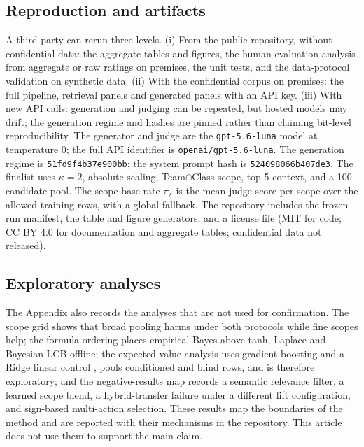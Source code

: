\documentclass{ieeeaccess}
\begin{document}
\subsection{Reproduction and artifacts}
\label{sec:repro}
A third party can rerun three levels. (i) From the public repository, without
confidential data: the aggregate tables and figures, the human-evaluation analysis
from aggregate or raw ratings on premises, the unit tests, and the data-protocol
validation on synthetic data. (ii) With the confidential corpus on premises: the
full pipeline, retrieval panels and generated panels with an API key. (iii) With new
API calls: generation and judging can be repeated, but hosted models may drift; the
generation regime and hashes are pinned rather than claiming bit-level
reproducibility. The generator and judge are the \texttt{gpt-5.6-luna} model at
temperature 0; the full API identifier is \mbox{\texttt{openai/gpt-5.6-luna}}.
The generation regime is \texttt{51fd9f4b37e900bb}; the system
prompt hash is \texttt{524098066b407de3}. The finalist uses $\kappa=2$, absolute
scaling, Team$\cap$Class scope, top-5 context, and a 100-candidate pool. The
scope base rate $\pi_s$ is the mean judge score per scope over the allowed training
rows, with a global fallback. The repository includes the frozen run manifest, the
table and figure generators, and a license file (MIT for code; CC BY 4.0 for
documentation and aggregate tables; confidential data not released).

\subsection{Exploratory analyses}
The Appendix also records the analyses that are not used for confirmation. The
scope grid shows that broad pooling harms under both protocols while fine scopes
help; the formula ordering places empirical Bayes above tanh, Laplace and Bayesian
LCB offline; the expected-value analysis uses gradient boosting \cite{b23} and a
Ridge linear control \cite{b24}, pools conditioned and blind rows, and is therefore
exploratory; and the negative-results map records a semantic relevance
filter, a learned scope blend, a hybrid-transfer failure under a different lift
configuration, and sign-based multi-action selection. These results map the
boundaries of the method and are reported with their mechanisms in the repository.
This article does not use them to support the main claim.
\end{document}
